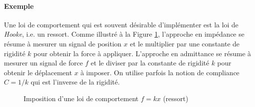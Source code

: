 \paragraph{Exemple} Une loi de comportement qui est souvent désirable d'implémenter est la loi de \textit{Hooke}, i.e. un ressort. Comme illustré à la Figure \ref{fig:impedanceadmitancespring}, l'approche en impédance se résume à mesurer un signal de position $x$ et le multiplier par une constante de rigidité $k$ pour obtenir la force à appliquer. L'approche en admittance se résume à mesurer un signal de force $f$ et le diviser par la constante de rigidité $k$ pour obtenir le déplacement $x$ à imposer. On utilise parfois la notion de compliance $C=1/k$ qui est l'inverse de la rigidité. 
\begin{figure}[H]
				\vspace{-10pt}
        \centering
				\hspace{5pt}
        \caption{Imposition d'une loi de comportement $f=kx$ (ressort)}
				\label{fig:impedanceadmitancespring}
\end{figure}

